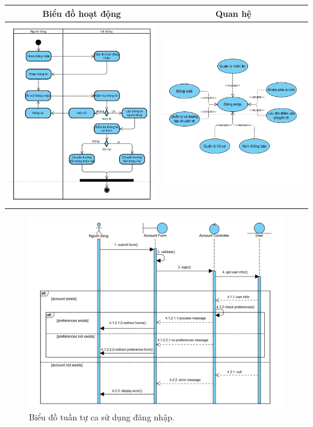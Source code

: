 \noindent 
\begin{tabular}{| c | c |}
    \hline
    \textbf{Biểu đồ hoạt động} & \textbf{Quan hệ} \\ 
    \hline
    \includegraphics[width=0.5\linewidth]{figures/c3/3-3-2-ad.png} 
    & 
    \includegraphics[width=0.45\linewidth]{figures/c3/3-3-2-rd.png} \\ 
    \hline
\end{tabular}
\vspace{0.8cm}

\begin{figure}[H]
    \centering  
    \includegraphics[width=1.05\textwidth]{figures/c3/3-3-2-sd.png}
    \caption{Biểu đồ tuần tự ca sử dụng đăng nhập.}
    \label{fig:3-3-1-sequence-diagram}
\end{figure}
